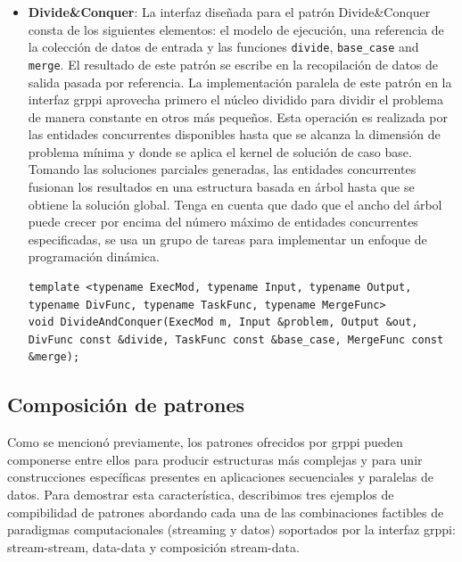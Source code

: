 \begin{itemize}
    \item \textbf{Divide\&Conquer}: La interfaz diseñada para el patrón Divide\&Conquer consta de los siguientes elementos: el modelo de ejecución, una referencia de la colección de datos de entrada y las funciones \texttt{divide}, \texttt{base\_case} and \texttt{merge}. El resultado de este patrón se escribe en la recopilación de datos de salida pasada por referencia. La implementación paralela de este patrón en la interfaz \acrshort{grppi} aprovecha primero el núcleo dividido para dividir el problema de manera constante en otros más pequeños. Esta operación es realizada por las entidades concurrentes disponibles hasta que se alcanza la dimensión de problema mínima y donde se aplica el kernel de solución de caso base. Tomando las soluciones parciales generadas, las entidades concurrentes fusionan los resultados en una estructura basada en árbol hasta que se obtiene la solución global. Tenga en cuenta que dado que el ancho del árbol puede crecer por encima del número máximo de entidades concurrentes especificadas, se usa un grupo de tareas para implementar un enfoque de programación dinámica.
    
    \vspace{0.35cm}
    \begin{lstlisting}[frame=single,label={code:dac},caption={Interfaz Divide\&Conquer.}]
template <typename ExecMod, typename Input, typename Output, typename DivFunc, typename TaskFunc, typename MergeFunc>
void DivideAndConquer(ExecMod m, Input &problem, Output &out, DivFunc const &divide, TaskFunc const &base_case, MergeFunc const &merge);
\end{lstlisting}
\vspace{0.35cm}
    
\end{itemize}

\subsection{Composición de patrones}

Como se mencionó previamente, los patrones ofrecidos por \acrshort{grppi} pueden componerse entre ellos para producir estructuras más complejas y para unir construcciones específicas presentes en aplicaciones secuenciales y paralelas de datos. Para demostrar esta característica, describimos tres ejemplos de compibilidad de patrones abordando cada una de las combinaciones factibles de paradigmas computacionales (streaming y datos) soportados por la interfaz \acrshort{grppi}: stream-stream, data-data y composición stream-data.

